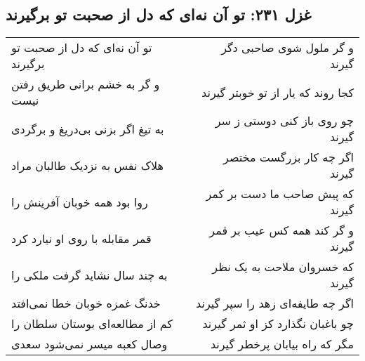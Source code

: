 \begin{center}
\section*{غزل ۲۳۱: تو آن نه‌ای که دل از صحبت تو برگیرند}
\label{sec:231}
\begin{longtable}{l p{0.5cm} r}
تو آن نه‌ای که دل از صحبت تو برگیرند
&&
و گر ملول شوی صاحبی دگر گیرند
\\
و گر به خشم برانی طریق رفتن نیست
&&
کجا روند که یار از تو خوبتر گیرند
\\
به تیغ اگر بزنی بی‌دریغ و برگردی
&&
چو روی باز کنی دوستی ز سر گیرند
\\
هلاک نفس به نزدیک طالبان مراد
&&
اگر چه کار بزرگست مختصر گیرند
\\
روا بود همه خوبان آفرینش را
&&
که پیش صاحب ما دست بر کمر گیرند
\\
قمر مقابله با روی او نیارد کرد
&&
و گر کند همه کس عیب بر قمر گیرند
\\
به چند سال نشاید گرفت ملکی را
&&
که خسروان ملاحت به یک نظر گیرند
\\
خدنگ غمزه خوبان خطا نمی‌افتد
&&
اگر چه طایفه‌ای زهد را سپر گیرند
\\
کم از مطالعه‌ای بوستان سلطان را
&&
چو باغبان نگذارد کز او ثمر گیرند
\\
وصال کعبه میسر نمی‌شود سعدی
&&
مگر که راه بیابان پرخطر گیرند
\\
\end{longtable}
\end{center}
